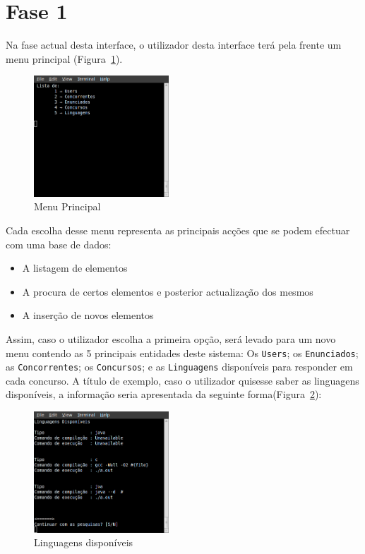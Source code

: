 \section{Fase 1}

Na fase actual desta interface, o utilizador desta interface terá pela frente um menu principal (Figura~\ref{img:menuprinc}). \\

\begin{figure}[H]
\begin{center}
\includegraphics[width=0.45\textwidth]{Images/menuPrinc}
\caption{Menu Principal}\label{img:menuprinc}
\end{center}
\end{figure} 

Cada escolha desse menu representa as principais acções que se podem efectuar com uma base de dados: 

\begin{itemize}
 \item A listagem de elementos
 \item A procura de certos elementos e posterior actualização dos mesmos
 \item A inserção de novos elementos
\end{itemize}

Assim, caso o utilizador escolha a primeira opção, será levado para um novo menu contendo as 5 principais entidades deste sistema: Os \texttt{Users}; os \texttt{Enunciados}; as \texttt{Concorrentes}; os \texttt{Concursos}; e as \texttt{Linguagens} disponíveis para responder em cada concurso. A título de exemplo, caso o utilizador quisesse saber 
as linguagens disponíveis, a informação seria apresentada da seguinte forma(Figura~\ref{img:linguagens}):\\

\begin{figure}[H]
\begin{center}
\includegraphics[width=0.45\textwidth]{Images/linguagens}
\caption{Linguagens disponíveis}\label{img:linguagens}
\end{center}
\end{figure} 

